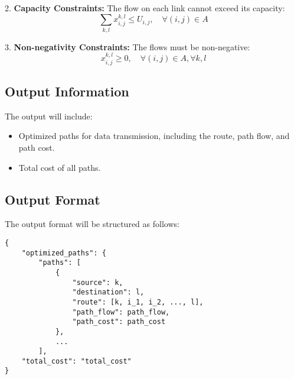 \documentclass{article}
\begin{document}
2. \textbf{Capacity Constraints:} The flow on each link cannot exceed its capacity:
\[
\sum_{k,l} x_{i,j}^{k,l} \leq U_{i,j}, \quad \forall (i,j) \in A
\]

3. \textbf{Non-negativity Constraints:} The flows must be non-negative:
\[
x_{i,j}^{k,l} \geq 0, \quad \forall (i,j) \in A, \forall k,l
\]

\subsection*{Output Information}
The output will include:
\begin{itemize}
    \item Optimized paths for data transmission, including the route, path flow, and path cost.
    \item Total cost of all paths.
\end{itemize}

\subsection*{Output Format}
The output format will be structured as follows:
\begin{verbatim}
{
    "optimized_paths": {
        "paths": [
            {
                "source": k,
                "destination": l,
                "route": [k, i_1, i_2, ..., l],
                "path_flow": path_flow,
                "path_cost": path_cost
            },
            ...
        ],
    "total_cost": "total_cost"
}
\end{verbatim}
\end{document}
